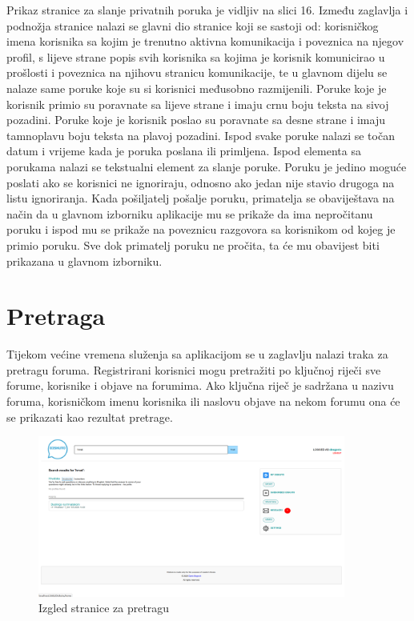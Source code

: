 \documentclass{foi}
\begin{document}
Prikaz stranice za slanje privatnih poruka je vidljiv na slici 16. Između zaglavlja i podnožja stranice nalazi se glavni dio stranice koji se sastoji od: korisničkog imena korisnika sa kojim je trenutno aktivna komunikacija i poveznica na njegov profil, s lijeve strane popis svih korisnika sa kojima je korisnik komunicirao u prošlosti i poveznica na njihovu stranicu komunikacije, te u glavnom dijelu se nalaze same poruke koje su si korisnici međusobno razmijenili. Poruke koje je korisnik primio su poravnate sa lijeve strane i imaju crnu boju teksta na sivoj pozadini. Poruke koje je korisnik poslao su poravnate sa desne strane i imaju tamnoplavu boju teksta na plavoj pozadini. Ispod svake poruke nalazi se točan datum i vrijeme kada je poruka poslana ili primljena. Ispod elementa sa porukama nalazi se tekstualni element za slanje poruke. Poruku je jedino moguće poslati ako se korisnici ne ignoriraju, odnosno ako jedan nije stavio drugoga na listu ignoriranja. Kada pošiljatelj pošalje poruku, primatelja se obaviještava na način da u glavnom izborniku aplikacije mu se prikaže da ima nepročitanu poruku i ispod mu se prikaže na poveznicu razgovora sa korisnikom od kojeg je primio poruku. Sve dok primatelj poruku ne pročita, ta će mu obavijest biti prikazana u glavnom izborniku.

\section{Pretraga}

Tijekom većine vremena služenja sa aplikacijom se u zaglavlju nalazi traka za pretragu foruma. Registrirani korisnici mogu pretražiti po ključnoj riječi sve forume, korisnike i objave na forumima. Ako ključna riječ je sadržana u nazivu foruma, korisničkom imenu korisnika ili naslovu objave na nekom forumu ona će se prikazati kao rezultat pretrage.

\begin{figure}[h!]
    \centering
    \includegraphics[width=0.9\textwidth]{slike/pretraga.png}
    \caption{Izgled stranice za pretragu}
\end{figure}
\end{document}
